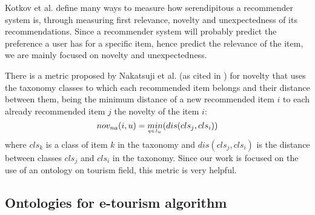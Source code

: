 Kotkov et al. \cite{kotkov2016survey} define many ways to measure how serendipitous a recommender system is, through measuring first relevance, novelty and unexpectedness of its recommendations. Since a recommender system will probably predict the preference a user has for a specific item, hence predict the relevance of the item, we are mainly focused on novelty and unexpectedness.

There is a metric proposed by Nakatsuji et al. (as cited in \cite{kotkov2016survey}) for novelty that uses the taxonomy classes to which each recommended item belongs and their distance between them, being the minimum distance of a new recommended item $i$ to each already recommended item $j$ the novelty of the item $i$:
\begin{equation}
    nov_{na}(i, u) = \underaccent{q \in I_u}{min}(dis(cls_j, cls_i))
\end{equation}
where $cls_k$ is a class of item $k$ in the taxonomy and $dis(cls_j, cls_i)$ is the distance between classes $cls_j$ and $cls_i$ in the taxonomy. Since our work is focused on the use of an ontology on tourism field, this metric is very helpful.

\subsection{Ontologies for e-tourism algorithm}
